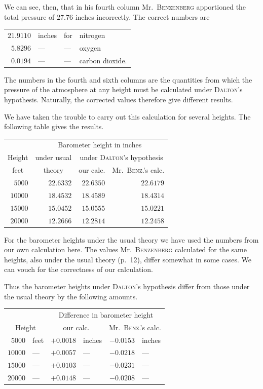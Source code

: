 We can see, then, that in his fourth column Mr.\ \textsc{Benzenberg} apportioned the total pressure of $27.76$ inches incorrectly. The correct numbers are
\begin{center}\begin{tabular}{rlll}
$21.9110$ & inches & for & nitrogen\\
$5.8296$ & — & — & oxygen\\
$0.0194$ & — & — & carbon dioxide.
\end{tabular}\end{center}
The numbers in the fourth and sixth columns are the quantities from which the pressure of the atmosphere at any height must be calculated under \textsc{Dalton}’s hypothesis. Naturally, the corrected values therefore give different results.

We have taken the trouble to carry out this calculation for several heights. The following table gives the results.
\begin{center}\begin{tabular}{r|r|r|r}
& \multicolumn{3}{c}{Barometer height in inches}\\
\multicolumn{1}{c|}{Height} & \multicolumn{1}{c|}{under usual} & \multicolumn{2}{c}{under \textsc{Dalton}’s hypothesis}\\
\multicolumn{1}{c|}{feet} & \multicolumn{1}{c|}{theory} & \multicolumn{1}{c|}{our calc.} & \multicolumn{1}{c}{Mr.\ \textsc{Benz}.’s calc.}\\\hline
$5000$ & $22.6332$ & $22.6350$ & $22.6179$\\
$10000$ & $18.4532$ & $18.4589$ & $18.4314$\\
$15000$ & $15.0452$ & $15.0555$ & $15.0221$\\
$20000$ & $12.2666$ & $12.2814$ & $12.2458$
\end{tabular}\end{center}

For the barometer heights under the usual theory we have used the numbers from our own calculation here. The values Mr.\ \textsc{Benzenberg} calculated for the same heights, also under the usual theory (p.\ 12), differ somewhat in some cases. We can vouch for the correctness of our calculation.

Thus the barometer heights under \textsc{Dalton}’s hypothesis differ from those under the usual theory by the following amounts.
\begin{center}\begin{tabular}{rl|rl|rl}
& & \multicolumn{4}{c}{Difference in barometer height}\\
\multicolumn{2}{c|}{Height} & \multicolumn{2}{c|}{our calc.} & \multicolumn{2}{c}{Mr.\ \textsc{Benz}.’s calc.}\\\hline
$5000$ & feet & $+0.0018$ & inches & $-0.0153$ & inches\\
$10000$ & — & $+0.0057$ & — & $-0.0218$ & —\\
$15000$ & — & $+0.0103$ & — & $-0.0231$ & —\\
$20000$ & — & $+0.0148$ & — & $-0.0208$ & —
\end{tabular}\end{center}

